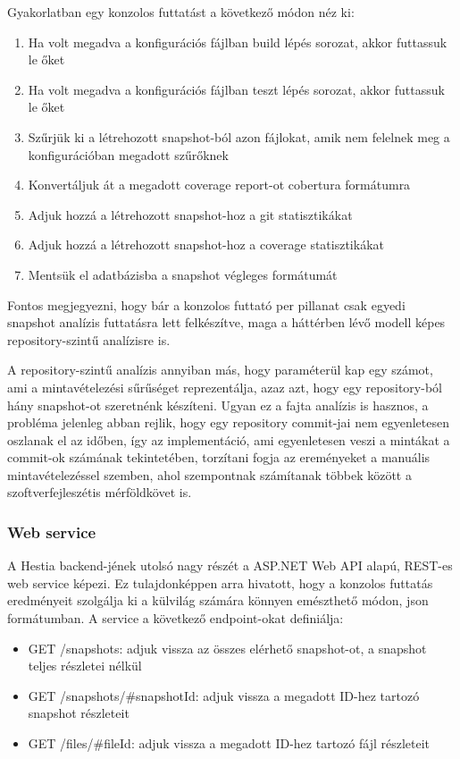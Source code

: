 Gyakorlatban egy konzolos futtatást a következő módon néz ki:
\begin{enumerate}
    \item Ha volt megadva a konfigurációs fájlban build lépés sorozat, akkor futtassuk le őket
    \item Ha volt megadva a konfigurációs fájlban teszt lépés sorozat, akkor futtassuk le őket
    \item Szűrjük ki a létrehozott snapshot-ból azon fájlokat, amik nem felelnek meg a konfigurációban megadott szűrőknek
    \item Konvertáljuk át a megadott coverage report-ot cobertura formátumra
    \item Adjuk hozzá a létrehozott snapshot-hoz a git statisztikákat
    \item Adjuk hozzá a létrehozott snapshot-hoz a coverage statisztikákat
    \item Mentsük el adatbázisba a snapshot végleges formátumát
\end{enumerate}

Fontos megjegyezni, hogy bár a konzolos futtató per pillanat csak egyedi snapshot analízis futtatásra lett felkészítve, maga a háttérben lévő modell képes repository-szintű analízisre is. 

A repository-szintű analízis annyiban más, hogy paraméterül kap egy számot, ami a mintavételezési sűrűséget reprezentálja, azaz azt, hogy egy repository-ból hány snapshot-ot szeretnénk készíteni. Ugyan ez a fajta analízis is hasznos, a probléma jelenleg abban rejlik, hogy egy repository commit-jai nem egyenletesen oszlanak el az időben, így az implementáció, ami egyenletesen veszi a mintákat a commit-ok számának tekintetében, torzítani fogja az ereményeket a manuális mintavételezéssel szemben, ahol szempontnak számítanak többek között a szoftverfejleszétis mérföldkövet is.

\subsubsection{Web service}

A Hestia backend-jének utolsó nagy részét a ASP.NET Web API alapú, REST-es web service képezi. Ez tulajdonképpen arra hivatott, hogy a konzolos futtatás eredményeit szolgálja ki a külvilág számára könnyen emészthető módon, json formátumban. A service a következő endpoint-okat definiálja:
\begin{itemize}
    \item GET /snapshots: adjuk vissza az összes elérhető snapshot-ot, a snapshot teljes részletei nélkül
    \item GET /snapshots/\#snapshotId: adjuk vissza a megadott ID-hez tartozó snapshot részleteit
    \item GET /files/\#fileId: adjuk vissza a megadott ID-hez tartozó fájl részleteit
\end{itemize}

